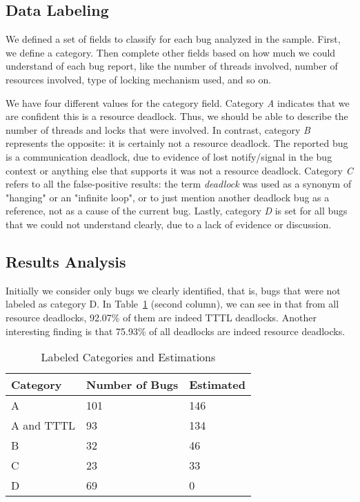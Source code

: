 \subsection{Data Labeling}

We defined a set of fields to classify for each bug analyzed in the sample. First, we define a category. Then complete other fields based on how much we could understand of each bug report, like the number of threads involved, number of resources involved, type of locking mechanism used, and so on.

We have four different values for the category field.
Category \emph{A} indicates that  we are confident this is a resource deadlock. Thus, we should be able to describe the number of threads and locks that were involved.
In contrast, category \emph{B} represents the opposite: it is certainly not a resource deadlock. The reported bug is a communication deadlock, due to evidence of lost notify/signal in the bug context or anything else that supports it was not a resource deadlock.
Category \emph{C} refers to all the false-positive results: the term \emph{deadlock} was used as a synonym of "hanging" or an "infinite loop", or to just mention another deadlock bug as a reference, not as a cause of the current bug.
Lastly, category \emph{D} is set for all bugs that we could not understand clearly, due to a lack of evidence or discussion.

\subsection{Results Analysis}

Initially we consider only bugs we clearly identified, that is, bugs that were not labeled as category D.
In Table~\ref{tab:categ} (second column), we can see in that from all resource deadlocks, 92.07\% of them are indeed TTTL deadlocks.
Another interesting finding is that 75.93\% of all deadlocks are indeed resource deadlocks.

\begin{table}
\begin{center}
\caption{Labeled Categories and Estimations}\label{tab:categ}
\begin{tabular}{|l|l|l|}
\hline
Category & Number of Bugs & Estimated \\
\hline
A & 101 & 146 \\
A and TTTL & 93 & 134  \\
B & 32 & 46 \\
C & 23 & 33 \\
D & 69 & 0 \\
\hline
\end{tabular}
\end{center}
\end{table}

